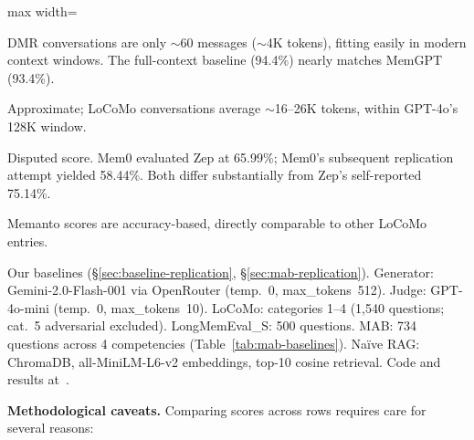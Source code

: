 \begin{table}[!t]
\begin{adjustbox}{max width=\textwidth}
\begin{threeparttable}
\begin{tablenotes}[flushleft]
\item[e] DMR conversations are only ${\sim}60$ messages (${\sim}$4K tokens), fitting easily in modern context windows.  The full-context baseline (94.4\%) nearly matches MemGPT (93.4\%).
\item[f] Approximate; LoCoMo conversations average ${\sim}$16--26K tokens, within GPT-4o's 128K window.
\item[g] Disputed score.  Mem0 evaluated Zep at 65.99\%; Mem0's subsequent replication attempt yielded 58.44\%.  Both differ substantially from Zep's self-reported 75.14\%.
\item[i] Memanto scores are accuracy-based, directly comparable to other LoCoMo entries.
	\item[h] Our baselines (\S\ref{sec:baseline-replication}, \S\ref{sec:mab-replication}).  Generator: Gemini-2.0-Flash-001 via OpenRouter (temp.~0, max\_tokens~512).  Judge: GPT-4o-mini (temp.~0, max\_tokens~10).  LoCoMo: categories 1--4 (1{,}540 questions; cat.~5 adversarial excluded).  LongMemEval\_S: 500 questions.  MAB: 734 questions across 4 competencies (Table~\ref{tab:mab-baselines}).  Na\"ive RAG: ChromaDB, all-MiniLM-L6-v2 embeddings, top-10 cosine retrieval.  Code and results at~\cite{alaya2026}.
\end{tablenotes}
\end{threeparttable}
\end{adjustbox}
\end{table}


\smallskip
\noindent\textbf{Methodological caveats.}\enspace
Comparing scores across rows requires care for several reasons:

